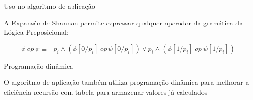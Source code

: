 \expandafter\documentclass\expandafter[table, usenames, svgnames, dvipsnames,14pt, \classopts]{beamer}
\begin{document}
\begin{frame}{Uso no algoritmo de aplicação}

    \small
    A Expansão de Shannon permite expressar qualquer operador da gramática da Lógica Proposicional:

    \scriptsize
    $$\phi~op~\psi \equiv \lnot{p_i} \land (\phi[0/p_i]~op~\psi[0/p_i]) \lor p_i \land (\phi[1/p_i]~op~\psi[1/p_i])$$
    
    \begin{center}
    \end{center}

\end{frame}

\begin{frame}{Programação dinâmica}

    \begin{outline}
        \1 O algoritmo de aplicação também utiliza programação dinâmica para melhorar a eficiência
            \2[-] recursão com tabela para armazenar valores já calculados
    \end{outline}
    
    \begin{center}
    \end{center}    
    
\end{frame}
\end{document}
